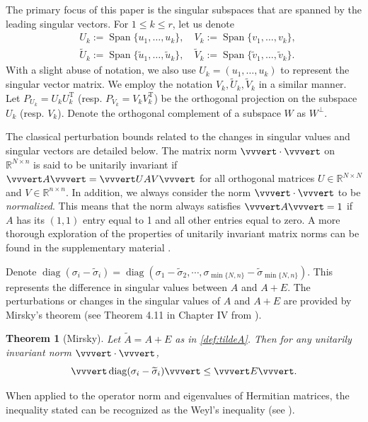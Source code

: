\documentclass[reqno]{amsart}
\DeclareMathOperator{\diag}{diag}
\DeclareMathOperator{\Span}{Span}
\newcommand{\T}{\mathrm{T}}
\theoremstyle{plain}
\newtheorem{theorem}{Theorem}
\theoremstyle{definition}
\begin{document}
The primary focus of this paper is the singular subspaces that are spanned by the leading singular vectors. For $1\le k \le r$, let us denote
\begin{equation*}%
\begin{aligned}
&U_k := \Span\{u_1,\ldots, u_k \}, \quad V_k := \Span\{v_1,\ldots, v_k \},\\
&\widetilde U_k := \Span\{\widetilde u_1,\ldots, \widetilde u_k \}, \quad \widetilde V_k := \Span\{\widetilde v_1,\ldots, \widetilde v_k \}.
\end{aligned}
\end{equation*}
With a slight abuse of notation, we also use $U_k = (u_1,\ldots, u_k)$ to represent the singular vector matrix. We employ the notation $V_k, \widetilde U_k, \widetilde V_k$ in a similar manner. Let $P_{U_k}=U_k U_k^\T$ (resp. $P_{V_k}=V_k V_k^\T$) be the orthogonal projection on the  subspace $U_k$ (resp. $V_k$). Denote the orthogonal complement of a subspace $W$ as $W^\perp$.

The classical perturbation bounds related to the changes in singular values and singular vectors are detailed below. The matrix norm $\vvvert \cdot \vvvert $ on $\mathbb R^{N\times n}$ is said to be unitarily invariant if $\vvvert A\vvvert  = \vvvert UAV\vvvert $ for all orthogonal matrices $U \in \mathbb R^{N\times N}$ and $V \in \mathbb R^{n\times n}$. In addition, we always consider the norm $\vvvert \cdot \vvvert $ to be \emph{normalized}.  This means that the norm always satisfies $\vvvert A \vvvert = 1$ if $A$ has its $(1,1)$ entry equal to 1 and all other entries equal to zero. A more thorough exploration of the properties of unitarily invariant matrix norms can be found in the supplementary material \cite{WangSupp24}. 

Denote
$\diag(\sigma_i - \widetilde\sigma_i)=\diag(\sigma_1 - \widetilde\sigma_2, \cdots, \sigma_{\min\{N,n\}} - \widetilde{\sigma}_{\min\{N,n\}}).$ This represents the difference in singular values between $A$ and $A+E$. The perturbations or changes in the singular values of $A$ and $A+E$ are provided by Mirsky's theorem (see Theorem 4.11 in Chapter IV from \cite{MR1061154}). 
\begin{theorem}[Mirsky]
Let $\widetilde{A} = A + E$ as in \eqref{def:tildeA}. Then for any unitarily invariant norm $\vvvert \cdot \vvvert$,
$$\vvvert \diag(\sigma_i - \widetilde\sigma_i) \vvvert \le \vvvert E \vvvert.$$
\end{theorem}
When applied to the operator norm and eigenvalues of Hermitian matrices, the inequality stated can be recognized as the Weyl's inequality (see \cite[Corollary III.2.6]{Bhatia}).
\end{document}
